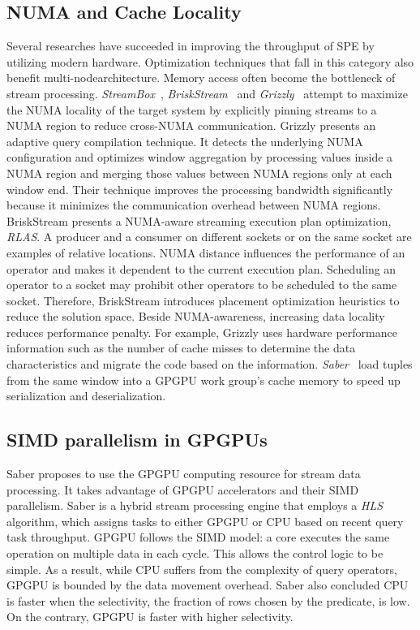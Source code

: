 \documentclass[runningheads]{llncs}
\begin{document}
\subsection{NUMA and Cache Locality}
Several researches have succeeded in improving the throughput of \ac{SPE} by
utilizing modern hardware. Optimization techniques that fall in this 
category also benefit multi-nodearchitecture. Memory access often become the 
bottleneck of stream processing. \emph{StreamBox}~\cite{StreamBox}, \emph{BriskStream}~\cite{BriskStream} and \emph{Grizzly}~\cite{Grizzly}
attempt to maximize the \ac{NUMA} locality of the target system by explicitly
pinning streams to a \ac{NUMA} region to reduce cross-\ac{NUMA} communication.
%
Grizzly presents an adaptive query compilation technique.  It detects the
underlying \ac{NUMA} configuration and optimizes window aggregation by
processing values inside a \ac{NUMA} region and merging those values between
\ac{NUMA} regions only at each window end.
%
Their technique improves the processing bandwidth significantly because it
minimizes the communication overhead between \ac{NUMA} regions.
%
BriskStream presents a \ac{NUMA}-aware streaming execution plan optimization,
\emph{\ac{RLAS}}. A producer and a consumer on different sockets or on the same
socket are examples of relative locations. 
%
\Ac{NUMA} distance influences the performance of an operator and makes it
dependent to the current execution plan. Scheduling an operator to a socket may
prohibit other operators to be scheduled to the same socket. Therefore,
BriskStream introduces placement optimization heuristics to reduce the solution
space.
%
Beside NUMA-awareness, increasing data locality reduces performance penalty.
%
For example, Grizzly uses hardware performance information such as the number
of cache misses to determine the data characteristics and migrate the code
based on the information.
\emph{Saber}~\cite{SABER} load tuples from the same window into a GPGPU work
group's cache memory to speed up serialization and deserialization.

\subsection{SIMD parallelism in GPGPUs}
Saber proposes to use the GPGPU computing resource for stream data processing.
It takes advantage of GPGPU accelerators and their \ac{SIMD} parallelism. Saber
is a hybrid stream processing engine that employs a \emph{\ac{HLS}} algorithm,
which assigns tasks to either GPGPU or CPU based on recent query task
throughput.
%
GPGPU follows the \ac{SIMD} model: a core executes the same operation on
multiple data in each cycle. This allows the control logic to be simple.  As a
result, while CPU suffers from the complexity of query operators, GPGPU is
bounded by the data movement overhead. Saber also concluded CPU is faster when
the selectivity, the fraction of rows chosen by the predicate, is low. On the
contrary, GPGPU is faster with higher selectivity.
\end{document}
